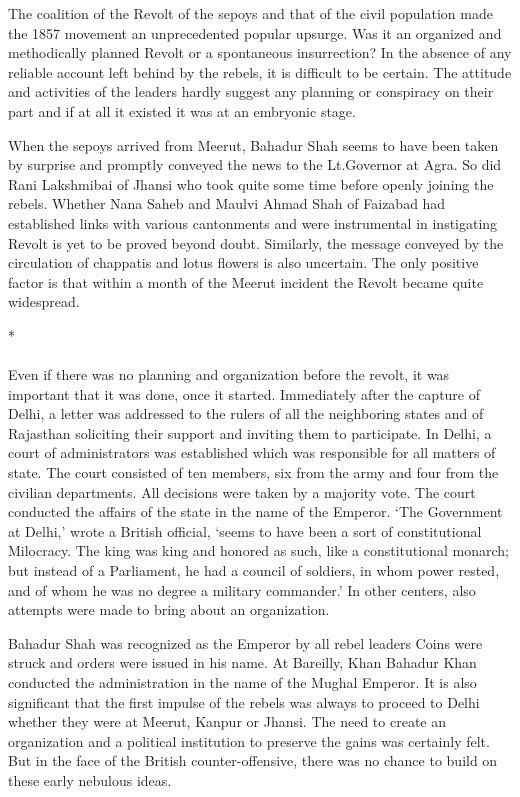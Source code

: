 The coalition of the Revolt of the sepoys and that of the civil population made the 1857 movement an unprecedented popular upsurge. Was it an organized and methodically planned Revolt or a spontaneous insurrection? In the absence of any reliable account left behind by the rebels, it is difficult to be certain. The attitude and activities of the leaders hardly suggest any planning or conspiracy on their part and if at all it existed it was at an embryonic stage.

When the sepoys arrived from Meerut, Bahadur Shah seems to have been taken by surprise and promptly conveyed the news to the Lt.Governor at Agra. So did Rani Lakshmibai of Jhansi who took quite some time before openly joining the rebels. Whether Nana Saheb and Maulvi Ahmad Shah of Faizabad had established links with various cantonments and were instrumental in instigating Revolt is yet to be proved beyond doubt. Similarly, the message conveyed by the circulation of chappatis and lotus flowers is also uncertain. The only positive factor is that within a month of the Meerut incident the Revolt became quite widespread.

\begin{center}*\end{center}

\paragraph*{}
Even if there was no planning and organization before the revolt, it was important that it was done, once it started. Immediately after the capture of Delhi, a letter was addressed to the rulers of all the neighboring states and of Rajasthan soliciting their support and inviting them to participate. In Delhi, a court of administrators was established which was responsible for all matters of state. The court consisted of ten members, six from the army and four from the civilian departments. All decisions were taken by a majority vote. The court conducted the affairs of the state in the name of the Emperor. `The Government at Delhi,' wrote a British official, `seems to have been a sort of constitutional Milocracy. The king was king and honored as such, like a constitutional monarch; but instead of a Parliament, he had a council of soldiers, in whom power rested, and of whom he was no degree a military commander.' In other centers, also attempts were made to bring about an organization.

Bahadur Shah was recognized as the Emperor by all rebel leaders Coins were struck and orders were issued in his name. At Bareilly, Khan Bahadur Khan conducted the administration in the name of the Mughal Emperor. It is also significant that the first impulse of the rebels was always to proceed to Delhi whether they were at Meerut, Kanpur or Jhansi. The need to create an organization and a political institution to preserve the gains was certainly felt. But in the face of the British counter-offensive, there was no chance to build on these early nebulous ideas.

